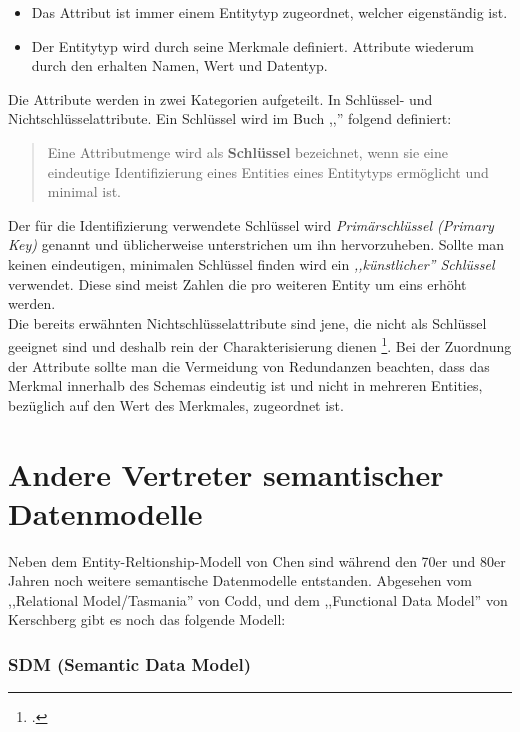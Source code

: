 \begin{itemize}
	\item Das Attribut ist immer einem Entitytyp zugeordnet, welcher eigenständig ist.
	\item Der Entitytyp wird durch seine Merkmale definiert. Attribute wiederum durch den erhalten Namen, Wert und Datentyp.
	\\
\end{itemize}

\noindent
Die Attribute werden in zwei Kategorien aufgeteilt. In Schlüssel- und Nichtschlüsselattribute. Ein Schlüssel wird im Buch ,,'' folgend definiert:

\begin{quote}
	Eine Attributmenge wird als \textbf{Schlüssel} bezeichnet, wenn sie eine eindeutige Identifizierung eines Entities eines Entitytyps ermöglicht und minimal ist.
\end{quote}

\noindent
Der für die Identifizierung verwendete Schlüssel wird \textit{Primärschlüssel (Primary Key)} genannt und üblicherweise unterstrichen um ihn hervorzuheben. Sollte man keinen eindeutigen, minimalen Schlüssel finden wird ein \textit{,,künstlicher'' Schlüssel} verwendet. Diese sind meist Zahlen die pro weiteren Entity um eins erhöht werden.
\\

\noindent
Die bereits erwähnten Nichtschlüsselattribute sind jene, die nicht als Schlüssel geeignet sind und deshalb rein der Charakterisierung dienen \footcite{taschenbuch}. Bei der Zuordnung der Attribute sollte man die Vermeidung von Redundanzen beachten, dass das Merkmal innerhalb des Schemas eindeutig ist und nicht in mehreren Entities, bezüglich auf den Wert des Merkmales, zugeordnet ist.
\\

\section{Andere Vertreter semantischer Datenmodelle}
\prc
Neben dem Entity-Reltionship-Modell von Chen sind während den 70er und 80er Jahren noch weitere semantische Datenmodelle entstanden. Abgesehen vom ,,Relational Model/Tasmania'' von Codd, und dem ,,Functional Data Model'' von Kerschberg \footnotemark[6] gibt es noch das folgende Modell:

\subsubsection{SDM (Semantic Data Model)}

